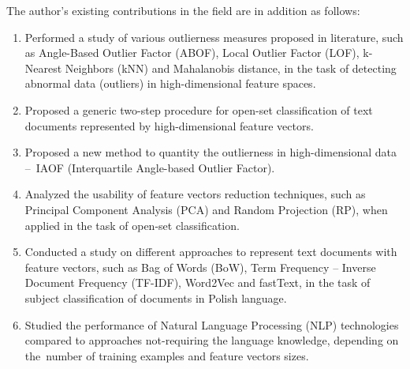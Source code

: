The author's existing contributions in the field are in addition as follows:
\vspace{-0.5\baselineskip}
\begin{enumerate}
    \item Performed a study of various outlierness measures proposed in literature, such as Angle-Based Outlier Factor (ABOF), Local Outlier Factor (LOF), k-Nearest Neighbors (kNN) and Mahalanobis distance, in the task of detecting abnormal data (outliers) in high-dimensional feature spaces. \cite{Walkowiak-2018-asmbi}\cite{Walkowiak-2019-intellisys}\cite{Datko-2024}

    \item Proposed a generic two-step procedure for open-set classification of text documents represented by high-dimensional feature vectors. \cite{Walkowiak-2018-asmbi}

    \item Proposed a new method to quantity the outlierness in high-dimensional data –~IAOF (Interquartile Angle-based Outlier Factor). \cite{Walkowiak-2018-asmbi}

    \item Analyzed the usability of feature vectors reduction techniques, such as Principal Component Analysis (PCA) and Random Projection (RP), when applied in the task of open-set classification. \cite{Walkowiak-2019-relstat}

    \item Conducted a study on different approaches to represent text documents with feature vectors, such as Bag of Words (BoW), Term Frequency – Inverse Document Frequency (TF-IDF), Word2Vec and fastText, in the task of subject classification of documents in Polish language. \cite{Walkowiak-2018-icaisc}

    \item Studied the performance of Natural Language Processing (NLP) technologies compared to approaches not-requiring the language knowledge, depending on the~number of training examples and feature vectors sizes. \cite{Walkowiak-2018-depcos}


\end{enumerate}

